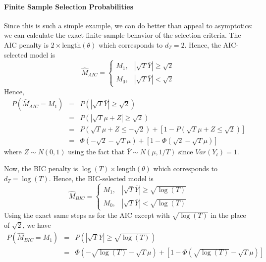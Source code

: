 \documentclass[12pt]{article}
\theoremstyle{definition}
\begin{document}
\paragraph{Finite Sample Selection Probabilities} Since this is such a simple example, we can do better than appeal to asymptotics: we can calculate the exact finite-sample behavior of the selection criteria. The AIC penalty is $2 \times \mbox{length}(\theta)$ which corresponds to $d_T = 2$. Hence, the AIC-selected model is
	$$\widehat{M}_{AIC} = \left\{\begin{array}
		{cc} M_1, &|\sqrt{T}\bar{Y}| \geq \sqrt{2} \\
		M_0, & |\sqrt{T} \bar{Y}| < \sqrt{2}
	\end{array} \right.$$
Hence,
	\begin{eqnarray*}
		P\left(\widehat{M}_{AIC} = M_1\right) &=& P\left(\left|\sqrt{T}\bar{Y} \right| \geq \sqrt{2}  \right)\\
		&=& P\left(\left|\sqrt{T}\mu + Z\right| \geq \sqrt{2}  \right)\\
		&=& P\left(\sqrt{T}\mu + Z \leq -\sqrt{2}\right) + \left[1 - P\left(\sqrt{T} \mu +Z \leq \sqrt{2}\right) \right]\\
			&=& \Phi\left(-\sqrt{2} - \sqrt{T}\mu\right) + \left[1 -  \Phi\left(\sqrt{2} - \sqrt{T} \mu \right)\right]
	\end{eqnarray*}
where $Z \sim N(0,1)$ using the fact that $\bar{Y} \sim N(\mu, 1/T)$ since $Var(Y_t)=1$.

Now, the BIC penalty is $\log(T)\times \mbox{length}(\theta)$ which corresponds to $d_T = \log(T)$. Hence, the BIC-selected model is
	$$\widehat{M}_{BIC} = \left\{\begin{array}
		{cc} M_1, & |\sqrt{T}\bar{Y} | \geq \sqrt{\log(T)} \\
		M_0, & |\sqrt{T} \bar{Y}| < \sqrt{\log(T)}
	\end{array} \right.$$
Using the exact same steps as for the AIC except with $\sqrt{\log(T)}$ in the place of $\sqrt{2}$, we have
	\begin{eqnarray*}
		P\left(\widehat{M}_{BIC} = M_1\right) &=& P\left(\left|\sqrt{T}\bar{Y} \right| \geq \sqrt{\log(T)}  \right)\\
			&=& \Phi\left(-\sqrt{\log(T)} - \sqrt{T}\mu\right) + \left[1 -  \Phi\left(\sqrt{\log(T)} - \sqrt{T} \mu \right)\right]
	\end{eqnarray*}

\end{document}
